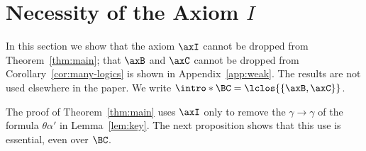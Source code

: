 \section{Necessity of the Axiom \texorpdfstring{$I$}{I}}\label{sec:remarks}

In this section we show that the axiom $\axI$ cannot be dropped from
Theorem~\ref{thm:main}; that $\axB$ and $\axC$ cannot be dropped from
Corollary~\ref{cor:many-logics} is shown in Appendix~\ref{app:weak}. The
results are not used elsewhere in the paper. \AP We write
$\intro*\BC=\lclos{\{\axB,\axC\}}$.

The proof of Theorem~\ref{thm:main} uses $\axI$ only to remove the
 $\gamma\to\gamma$ of the formula $\theta\alpha'$ in Lemma~\ref{lem:key}.
The next proposition shows that this use is essential, even over
$\BC$.

